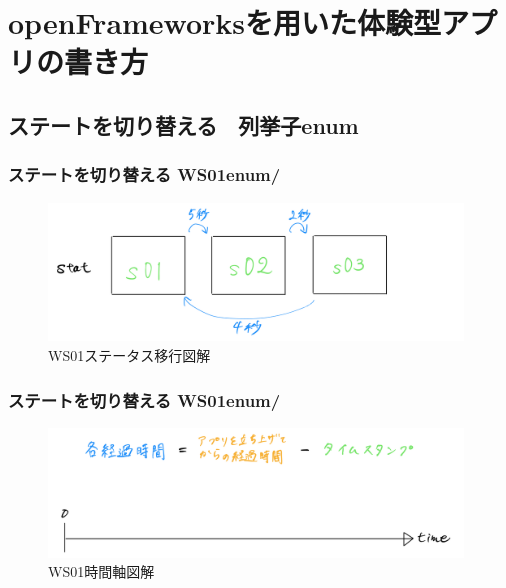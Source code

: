 \documentclass[10pt, dvipdfmx]{beamer}
\begin{document}
        \begin{frame}
        \end{frame}

        \begin{frame}
        \end{frame}

    \section{openFrameworksを用いた体験型アプリの書き方}
    \subsection{ステートを切り替える　列挙子enum}
        \begin{frame}
            \frametitle{ステートを切り替える WS01enum/}
            \begin{figure}[htb]
                 \includegraphics[width=110mm]{images/ws01-1.png}
                 \caption{WS01ステータス移行図解}
                \label{fig:11}
            \end{figure}
        \end{frame}

        \begin{frame}
            \frametitle{ステートを切り替える WS01enum/}
            \begin{figure}[htb]
                 \includegraphics[width=110mm]{images/ws01-2.png}
                 \caption{WS01時間軸図解}
                \label{fig:12}
            \end{figure}
        \end{frame}
\end{document}
